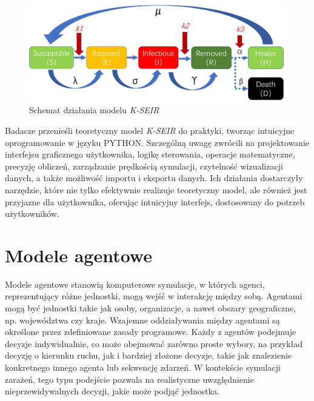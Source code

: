 \begin{figure}[h!]
	\includegraphics[width=\linewidth]{kseirscheme.png}
	\caption{Schemat działania modelu  \textit {K-SEIR}\cite{bib:artykul} }
\end{figure}

Badacze przenieśli teoretyczny model \textit {K-SEIR} do praktyki, tworząc intuicyjne oprogramowanie w języku PYTHON. Szczególną uwagę zwrócili na projektowanie interfejsu graficznego użytkownika, logikę sterowania, operacje matematyczne, precyzję obliczeń, zarządzanie prędkością symulacji, czytelność wizualizacji danych, a także możliwość importu i eksportu danych. Ich działania dostarczyły narzędzie, które nie tylko efektywnie realizuje teoretyczny model, ale również jest przyjazne dla użytkownika, oferując intuicyjny interfejs, dostosowany do potrzeb użytkowników.
\newpage
\section{\textbf{Modele agentowe}}

Modele agentowe stanowią komputerowe symulacje, w których agenci, reprezentujący różne jednostki, mogą wejść w interakcję między sobą. Agentami mogą być jednostki takie jak osoby, organizacje, a nawet obszary geograficzne, np. województwa czy kraje. Wzajemne oddziaływania między agentami są określone przez zdefiniowane zasady programowe. Każdy z agentów podejmuje decyzje indywidualnie, co może obejmować zarówno proste wybory, na przykład decyzję o kierunku ruchu, jak i bardziej złożone decyzje, takie jak znalezienie konkretnego innego agenta lub sekwencję zdarzeń. W kontekście symulacji zarażeń, tego typu podejście pozwala na realistyczne uwzględnienie nieprzewidywalnych decyzji, jakie może podjąć jednostka.

